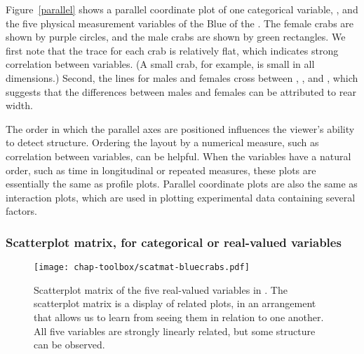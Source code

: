 Figure~\ref{parallel} shows a parallel coordinate plot of one
categorical variable, , and the five physical measurement
variables of the Blue  of the .
The female crabs are shown by purple circles, and the male crabs are
shown by green rectangles.  We first note that the trace for each
crab is relatively flat, which indicates strong correlation between
variables.  (A small crab, for example, is small in all dimensions.)
Second, the lines for males and females cross between , , and , which suggests that
the differences between males and females can be attributed to rear
width.


The order in which the parallel axes are positioned influences the
viewer's ability to detect structure.  Ordering the layout by a
numerical measure, such as correlation between variables, can be
helpful. When the variables have a natural order, such as time in
longitudinal or repeated measures, these plots are essentially the
same as profile plots. Parallel coordinate plots are also the same as
interaction plots, which are used in plotting experimental data
containing several factors.



\subsubsection{Scatterplot matrix, for categorical or 
real-valued variables}



\begin{figure}[htp]
\centerline{\texttt{[image: chap-toolbox/scatmat-bluecrabs.pdf]}}
\caption[Scatterplot matrix of the real-valued variables in
]{Scatterplot matrix of the five real-valued
variables in .  The scatterplot matrix is a
display of related plots, in an arrangement that allows us to learn
from seeing them in relation to one another.  All five variables are
strongly linearly related, but some structure can be observed.}
\label{matrix}
\end{figure}

